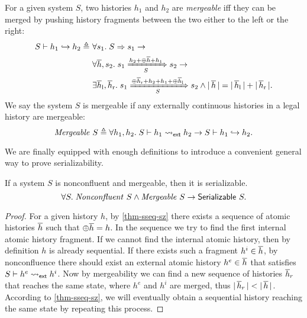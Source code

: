 \documentclass[sigplan,10pt,review,anonymous,screen]{acmart}\settopmatter{printfolios=true,printccs=false,printacmref=false}
\begin{document}
\begin{definition}
  For a given system $S$, two histories $h_1$ and $h_2$ are \emph{mergeable} iff
  they can be merged by pushing history fragments between the two either to the
  left or the right:
  \begin{align*}
    \hmgb{S}{h_1}{h_2} \triangleq\ & \forall s_1.\; \semrch{S}{s_1} \to \\
    & \forall \listof{h}, s_2.\; \semsteps{S}{s_1}{\listapp{h_2}{\listapp{\listconcat{\listof{h}}}{h_1}}}{s_2} \to \\
    & \exists \listof{h}_{\textrm{l}}, \listof{h}_{\textrm{r}}.\; \semsteps{S}{s_1}{\listapp{\listconcat{\listof{h}_{\textrm{r}}}}{\listapp{h_2}{\listapp{h_1}{\listconcat{\listof{h}_{\textrm{l}}}}}}}{s_2} \wedge \sizeof{\listof{h}} = \sizeof{\listof{h}_{\textrm{l}}} + \sizeof{\listof{h}_{\textrm{r}}}.
  \end{align*}
  We say the system $S$ is mergeable if any externally continuous histories in a
  legal history are mergeable:
  \begin{displaymath}
    \smgb{S} \triangleq \forall h_1, h_2.\; \hextcont{S}{h_1}{h_2} \to \hmgb{S}{h_1}{h_2}.
  \end{displaymath}
\end{definition}

We are finally equipped with enough definitions to introduce a convenient general way to prove serializability.

\begin{theorem}
  If a system $S$ is nonconfluent and mergeable, then it is serializable.
  \begin{displaymath}
    \forall S.\; \sncf{S} \land \smgb{S} \to \hsrz{S}.
  \end{displaymath}
  \label{thm-sz-when}
\end{theorem}
\begin{proof}
  For a given history $h$, by \autoref{thm-sseq-sz} there exists a sequence of atomic histories $\listof{h}$ such that $\listconcat{\listof{h}} = h$.
  In the sequence we try to find the first internal atomic history fragment.
  If we cannot find the internal atomic history, then by definition $h$ is already sequential.
  If there exists such a fragment $h^i \in \listof{h}$, by nonconfluence there should exist an external atomic history $h^e \in \listof{h}$ that satisfies $\hextcont{S}{h^e}{h^i}$.
  Now by mergeability we can find a new sequence of histories $\listof{h}_r$ that reaches the same state, where $h^e$ and $h^i$ are merged, thus $\sizeof{\listof{h}_r} < \sizeof{\listof{h}}$.
  According to \autoref{thm-sseq-sz}, we will eventually obtain a sequential history reaching the same state by repeating this process.
\end{proof}
\end{document}
